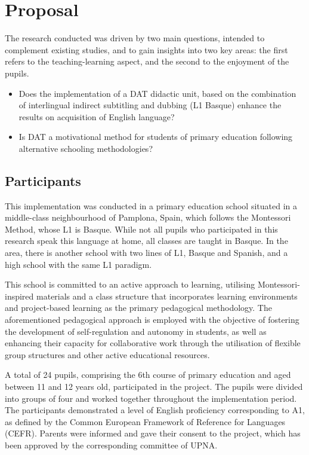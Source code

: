 \section{Proposal}\label{sec-proposal}

The research conducted was driven by two main questions, intended to
complement existing studies, and to gain insights into two key areas:
the first refers to the teaching-learning aspect, and the second to the
enjoyment of the pupils.

\begin{itemize}
    \item Does the implementation of a DAT didactic unit, based on the
    combination of interlingual indirect subtitling and dubbing (L1 Basque)
    enhance the results on acquisition of English language?

    \item Is DAT a motivational method for students of primary education
    following alternative schooling methodologies?
\end{itemize}

\subsection{Participants}\label{sub-sec-participants}

This implementation was conducted in a primary education school situated
in a middle-class neighbourhood of Pamplona, Spain, which follows the
Montessori Method, whose L1 is Basque. While not all pupils who
participated in this research speak this language at home, all classes
are taught in Basque. In the area, there is another school with two
lines of L1, Basque and Spanish, and a high school with the same L1
paradigm.

This school is committed to an active approach to learning, utilising
Montessori-inspired materials and a class structure that incorporates
learning environments and project-based learning as the primary
pedagogical methodology. The aforementioned pedagogical approach is
employed with the objective of fostering the development of
self-regulation and autonomy in students, as well as enhancing their
capacity for collaborative work through the utilisation of flexible
group structures and other active educational resources.

A total of 24 pupils, comprising the 6th course of primary education and
aged between 11 and 12 years old, participated in the project. The
pupils were divided into groups of four and worked together throughout
the implementation period. The participants demonstrated a level of
English proficiency corresponding to A1, as defined by the Common
European Framework of Reference for Languages (CEFR). Parents were
informed and gave their consent to the project, which has been approved
by the corresponding committee of UPNA.

